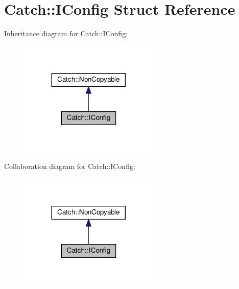 \hypertarget{structCatch_1_1IConfig}{}\section{Catch\+:\+:I\+Config Struct Reference}
\label{structCatch_1_1IConfig}


Inheritance diagram for Catch\+:\+:I\+Config\+:
\nopagebreak
\begin{figure}[H]
\begin{center}
\leavevmode
\includegraphics[width=188pt]{structCatch_1_1IConfig__inherit__graph}
\end{center}
\end{figure}


Collaboration diagram for Catch\+:\+:I\+Config\+:
\nopagebreak
\begin{figure}[H]
\begin{center}
\leavevmode
\includegraphics[width=188pt]{structCatch_1_1IConfig__coll__graph}
\end{center}
\end{figure}
